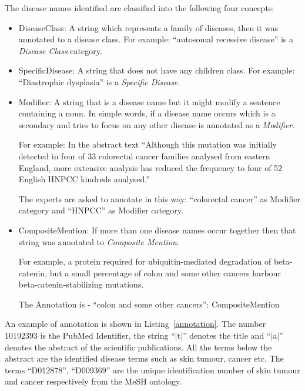 The disease names identified are classified into the following four concepts: 
\begin{itemize}
    \item DiseaseClass: A string which represents a family of diseases, then it was annotated to a disease class. For example: ``autosomal recessive disease'' is a \emph{Disease Class} category.  
    
    \item SpecificDisease: A string that does not have any children class. For example: ``Diastrophic dysplasia'' is a \emph{Specific Disease}. 
    
    \item Modifier: A string that is a disease name but it might modify a sentence containing a noun. In simple words, if a disease name occurs which is a secondary and tries to focus on any other disease is annotated as a \emph{Modifier}. 
    
    For example: In the abstract text ``Although this mutation was initially detected in four of 33 colorectal cancer families analysed from eastern England, more extensive analysis has reduced the frequency to four of 52 English HNPCC kindreds analysed.'' 
    
    The experts are asked to annotate in this way: ``colorectal cancer'' as Modifier category and ``HNPCC'' as Modifier category. 
    
    \item CompositeMention: If more than one disease names occur together then that string was annotated to \emph{Composite Mention}. 
    
    For example, a protein required for ubiquitin-mediated degradation of beta-catenin, but a small percentage of colon and some other cancers harbour beta-catenin-stabilizing mutations. 
    
    The Annotation is - ``colon and some other cancers'': CompositeMention
    
\end{itemize}
 An example of annotation is shown in Listing~\ref{annotation}. 
The number $10192393$ is the PubMed Identifier, the string ``$|$t$|$'' denotes the title and ``$|$a$|$'' denotes the abstract of the scientific publications. All the terms below the abstract are the identified disease terms such as skin tumour, cancer etc. The terms ``D012878'', ``D009369'' are the unique identification number of skin tumour and cancer respectively from the MeSH ontology. 

